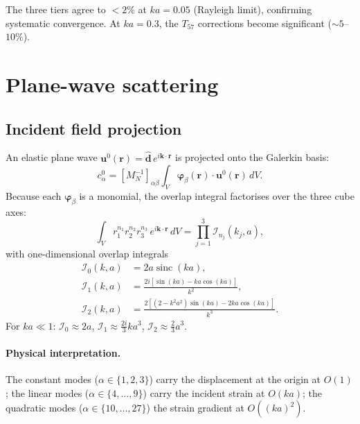 \documentclass[11pt,a4paper]{article}
\newcommand{\br}{\bm{r}}
\newcommand{\bu}{\bm{u}}
\newcommand{\bphi}{\bm{\varphi}}
\theoremstyle{plain}
\theoremstyle{definition}
\theoremstyle{remark}
\begin{document}
The three tiers agree to $<2\%$ at $ka = 0.05$ (Rayleigh limit),
confirming systematic convergence.  At $ka = 0.3$, the $T_{57}$
corrections become significant ($\sim 5$--$10\%$).


\section{Plane-wave scattering}
\label{sec:plane-wave}

\subsection{Incident field projection}

An elastic plane wave $\bu^0(\br) = \hat{\bm{d}}\,e^{i\bm{k}\cdot\br}$
is projected onto the Galerkin basis:
\begin{equation}
  c^0_\alpha = [M_N^{-1}]_{\alpha\beta}\!
  \int_V \bphi_\beta(\br)\cdot\bu^0(\br)\,dV.
  \label{eq:c0-projection}
\end{equation}
Because each $\bphi_\beta$ is a monomial, the overlap integral
factorises over the three cube axes:
\begin{equation}
  \int_V r_1^{n_1}r_2^{n_2}r_3^{n_3}\,e^{i\bm{k}\cdot\br}\,dV
  = \prod_{j=1}^3 \mathcal{I}_{n_j}(k_j,a),
  \label{eq:overlap-factorise}
\end{equation}
with one-dimensional overlap integrals
\begin{align}
  \mathcal{I}_0(k,a) &= 2a\operatorname{sinc}(ka),\label{eq:I0}\\
  \mathcal{I}_1(k,a) &= \frac{2i[\sin(ka) - ka\cos(ka)]}{k^2},
    \label{eq:I1}\\
  \mathcal{I}_2(k,a) &= \frac{2[(2-k^2a^2)\sin(ka) - 2ka\cos(ka)]}{k^3}.
    \label{eq:I2}
\end{align}
For $ka \ll 1$: $\mathcal{I}_0 \approx 2a$, $\mathcal{I}_1 \approx
\frac{2i}{3}ka^3$, $\mathcal{I}_2 \approx \frac{2}{3}a^3$.

\paragraph{Physical interpretation.}
The constant modes ($\alpha \in \{1,2,3\}$) carry the displacement at
the origin at $O(1)$; the linear modes ($\alpha \in \{4,\ldots,9\}$)
carry the incident strain at $O(ka)$; the quadratic modes
($\alpha \in \{10,\ldots,27\}$) the strain gradient at $O((ka)^2)$.
\end{document}
